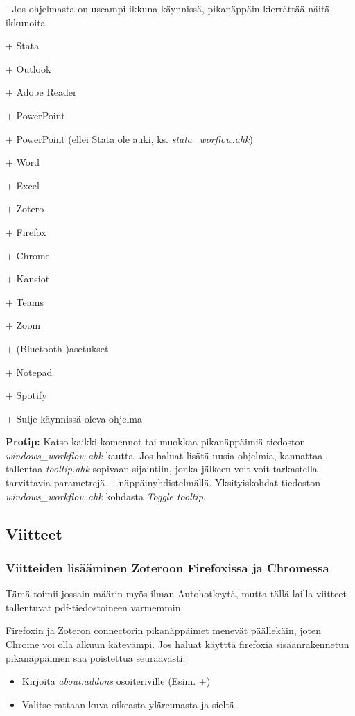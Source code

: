 \documentclass[a4paper,12pt]{scrartcl}
\begin{document}
- Jos ohjelmasta on useampi ikkuna käynnissä, pikanäppäin kierrättää näitä ikkunoita

\medskip

+ Stata

+ Outlook

+ Adobe Reader

+ PowerPoint

+\menu{<} PowerPoint (ellei Stata ole auki, ks. \emph{stata\_worflow.ahk})

+ Word

+ Excel

+ Zotero

+ Firefox

+\keys{\shift} Chrome

+ Kansiot

+ Teams

+ Zoom

+ (Bluetooth-)asetukset

+ Notepad

+ Spotify

+ Sulje käynnissä oleva ohjelma

\textbf{Protip:} Katso kaikki komennot tai muokkaa pikanäppäimiä tiedoston \emph{windows\_workflow.ahk} kautta. Jos haluat lisätä uusia ohjelmia, kannattaa tallentaa \emph{tooltip.ahk} sopivaan sijaintiin, jonka jälkeen voit voit tarkastella tarvittavia parametrejä + näppäinyhdistelmällä. Yksityiskohdat tiedoston \emph{windows\_workflow.ahk} kohdasta \emph{Toggle tooltip}.

\subsection{Viitteet}

\subsubsection{Viitteiden lisääminen Zoteroon Firefoxissa ja Chromessa}

Tämä toimii jossain määrin myös ilman Autohotkeytä, mutta tällä lailla viitteet tallentuvat pdf-tiedostoineen varmemmin.

Firefoxin ja Zoteron connectorin pikanäppäimet menevät päällekäin, joten Chrome voi olla alkuun kätevämpi. Jos haluat käytttä firefoxia sisäänrakennetun pikanäppäimen saa poistettua seuraavasti:
\begin{itemize}
	\item Kirjoita \emph{about:addons} osoiteriville (Esim. +)
	\item Valitse rattaan kuva oikeasta yläreunasta ja sieltä 
\end{itemize} 
\end{document}
